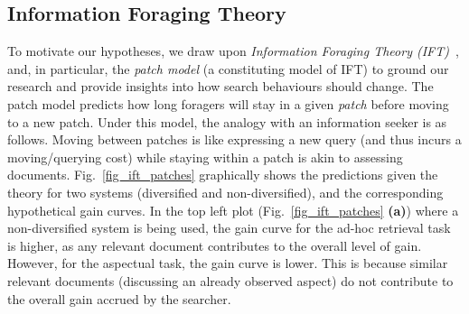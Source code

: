 \subsection{Information Foraging Theory} \label{sec:ift}


To motivate our hypotheses, we draw upon \emph{Information Foraging Theory (IFT)}~\cite{pirolli1999ift}, and, in particular, the \textit{patch model} (a constituting model of IFT) to ground our research and provide insights into how search behaviours should change. %
The patch model predicts how long foragers will stay in a given \emph{patch} before moving to a new patch. Under this model, the analogy with an information seeker is as follows. Moving between patches is like expressing a new query (and thus incurs a moving/querying cost) while staying within a patch is akin to assessing documents. 
Fig.~\ref{fig_ift_patches} graphically shows the predictions given the theory for two systems (diversified and non-diversified), and the corresponding hypothetical gain curves. In the top left plot (Fig.~\ref{fig_ift_patches} \textbf{(a)}) where a non-diversified system is being used, the gain curve for the ad-hoc retrieval task is higher, as any relevant document contributes to the overall level of gain. However, for the aspectual task, the gain curve is lower. This is because similar relevant documents (discussing an already observed aspect) do not contribute to the overall gain accrued by the searcher.

